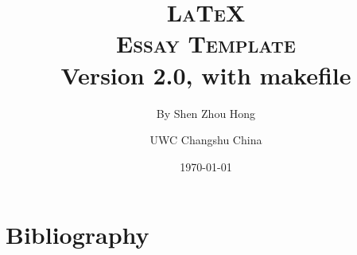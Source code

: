 \documentclass[
  12pt,       %
  a4paper,    %
  final,      %
  onecolumn,  %
  oneside,    %
  notitlepage %
]{article}
\title{
  \textbf{\textsc{\LaTeX \\ Essay Template}} \\ Version 2.0, with makefile
}
\author{
  By Shen Zhou Hong \and UWC Changshu China
}
\date{\today}
\begin{document}
\maketitle
\tableofcontents
\clearpage



\clearpage
\nocite{*}
\section{Bibliography}
\printbibliography[heading=none]

\end{document}
